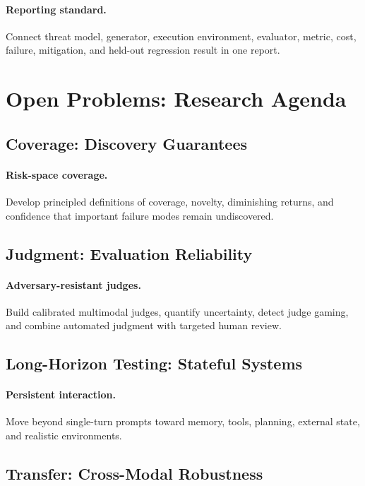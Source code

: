 \documentclass[review]{fcs}
\begin{document}
\paragraph{Reporting standard.}
Connect threat model, generator, execution environment, evaluator, metric, cost, failure, mitigation, and held-out regression result in one report.

\section{Open Problems: Research Agenda}
\label{sec:agenda}

\subsection{Coverage: Discovery Guarantees}

\paragraph{Risk-space coverage.}
Develop principled definitions of coverage, novelty, diminishing returns, and confidence that important failure modes remain undiscovered.

\subsection{Judgment: Evaluation Reliability}

\paragraph{Adversary-resistant judges.}
Build calibrated multimodal judges, quantify uncertainty, detect judge gaming, and combine automated judgment with targeted human review.

\subsection{Long-Horizon Testing: Stateful Systems}

\paragraph{Persistent interaction.}
Move beyond single-turn prompts toward memory, tools, planning, external state, and realistic environments.

\subsection{Transfer: Cross-Modal Robustness}
\end{document}
